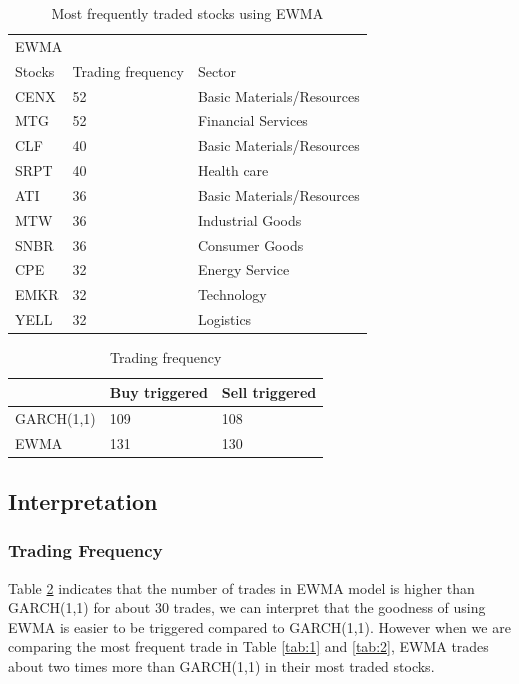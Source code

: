 \documentclass[11pt,a4paper]{article}
\begin{document}
    
    \begin{table}[H]
    \centering
    \begin{tabular}{lll}
    \hline
    \multicolumn{3}{l}{EWMA}                               \\
    Stocks & Trading frequency & Sector                    \\ \hline
    CENX   & 52                & Basic Materials/Resources \\
    MTG    & 52                & Financial Services        \\
    CLF    & 40                & Basic Materials/Resources \\
    SRPT   & 40                & Health care               \\
    ATI    & 36                & Basic Materials/Resources \\
    MTW    & 36                & Industrial Goods          \\
    SNBR   & 36                & Consumer Goods            \\
    CPE    & 32                & Energy Service            \\
    EMKR   & 32                & Technology                \\
    YELL   & 32                & Logistics                 \\ \hline
    \end{tabular}
    \caption{Most frequently traded stocks using EWMA
    }
    \label{tab:3}
    \end{table}
    
    
    \begin{table}[H]
    \centering
    \begin{tabular}{l|ll}
    \hline
               & Buy triggered & Sell triggered \\ \hline
    GARCH(1,1) & 109           & 108            \\
    EWMA       & 131           & 130            \\ \hline
    \end{tabular}
    \caption{Trading frequency}
    \label{tab:4}
    \end{table}
    
    \newpage
    \subsection{Interpretation}
    \subsubsection{Trading Frequency}
    Table \ref{tab:4} indicates that the number of trades in EWMA model is higher than GARCH(1,1) for about 30 trades, we can interpret that the goodness of using EWMA is easier to be triggered compared to GARCH(1,1). However when we are comparing the most frequent trade in Table \ref{tab:1} and \ref{tab:2}, EWMA trades about two times more than GARCH(1,1) in their most traded stocks.
    
\end{document}
